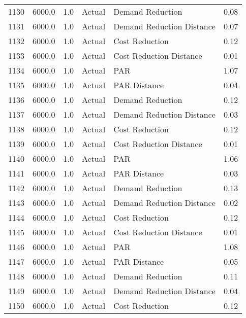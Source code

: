 \begin{longtable}{lrrllr}
1130 &       6000.0 &     1.0 &         Actual &           Demand Reduction &   0.08 \\
1131 &       6000.0 &     1.0 &         Actual &  Demand Reduction Distance &   0.07 \\
1132 &       6000.0 &     1.0 &         Actual &             Cost Reduction &   0.12 \\
1133 &       6000.0 &     1.0 &         Actual &    Cost Reduction Distance &   0.01 \\
1134 &       6000.0 &     1.0 &         Actual &                        PAR &   1.07 \\
1135 &       6000.0 &     1.0 &         Actual &               PAR Distance &   0.04 \\
1136 &       6000.0 &     1.0 &         Actual &           Demand Reduction &   0.12 \\
1137 &       6000.0 &     1.0 &         Actual &  Demand Reduction Distance &   0.03 \\
1138 &       6000.0 &     1.0 &         Actual &             Cost Reduction &   0.12 \\
1139 &       6000.0 &     1.0 &         Actual &    Cost Reduction Distance &   0.01 \\
1140 &       6000.0 &     1.0 &         Actual &                        PAR &   1.06 \\
1141 &       6000.0 &     1.0 &         Actual &               PAR Distance &   0.03 \\
1142 &       6000.0 &     1.0 &         Actual &           Demand Reduction &   0.13 \\
1143 &       6000.0 &     1.0 &         Actual &  Demand Reduction Distance &   0.02 \\
1144 &       6000.0 &     1.0 &         Actual &             Cost Reduction &   0.12 \\
1145 &       6000.0 &     1.0 &         Actual &    Cost Reduction Distance &   0.01 \\
1146 &       6000.0 &     1.0 &         Actual &                        PAR &   1.08 \\
1147 &       6000.0 &     1.0 &         Actual &               PAR Distance &   0.05 \\
1148 &       6000.0 &     1.0 &         Actual &           Demand Reduction &   0.11 \\
1149 &       6000.0 &     1.0 &         Actual &  Demand Reduction Distance &   0.04 \\
1150 &       6000.0 &     1.0 &         Actual &             Cost Reduction &   0.12 \\

\end{longtable}
